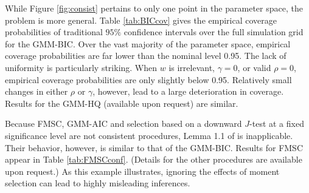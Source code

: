 \documentclass[12pt]{article}
\theoremstyle{definition}
\begin{document}
While Figure \ref{fig:consist} pertains to only one point in the parameter space, the problem is more general. Table \ref{tab:BICcov} gives the empirical coverage probabilities of traditional $95\%$ confidence intervals over the full simulation grid for the GMM-BIC. Over the vast majority of the parameter space, empirical coverage probabilities are far lower than the nominal level 0.95. The lack of uniformity is particularly striking. When $w$ is irrelevant, $\gamma = 0$, or valid $\rho = 0$, empirical coverage probabilities are only slightly below 0.95. Relatively small changes in either $\rho$ or $\gamma$, however, lead to a large deterioration in coverage. Results for the GMM-HQ (available upon request) are similar.


Because FMSC, GMM-AIC and selection based on a downward $J$-test at a fixed significance level are not consistent procedures, Lemma 1.1 of \citet{Poetscher1991} is inapplicable. Their behavior, however, is similar to that of the GMM-BIC. Results for FMSC appear in Table \ref{tab:FMSCconf}. (Details for the other procedures are available upon request.) As this example illustrates, ignoring the effects of moment selection can lead to highly misleading inferences.
%
\end{document}
